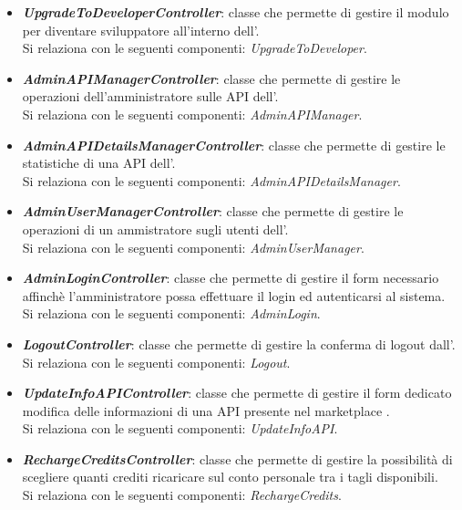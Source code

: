 \begin{itemize}
\begin{itemize}
		\item \textbf{\textit{UpgradeToDeveloperController}}: classe che permette di gestire il modulo per diventare sviluppatore all'interno dell'\progetto.\\
		Si relaziona con le seguenti componenti: \textit{UpgradeToDeveloper}.
		
		\item \textbf{\textit{AdminAPIManagerController}}: classe che permette di gestire le operazioni dell'amministratore sulle API dell'\progetto.\\
		Si relaziona con le seguenti componenti: \textit{AdminAPIManager}.
		
		\item \textbf{\textit{AdminAPIDetailsManagerController}}: classe che permette di gestire le statistiche di una API dell'\progetto.\\
		Si relaziona con le seguenti componenti: \textit{AdminAPIDetailsManager}.
		
		\item \textbf{\textit{AdminUserManagerController}}: classe che permette di gestire le operazioni di un ammistratore sugli utenti dell'\progetto.\\
		Si relaziona con le seguenti componenti: \textit{AdminUserManager}.
		
		\item \textbf{\textit{AdminLoginController}}: classe che permette di gestire il form necessario affinchè l'amministratore possa effettuare il login ed autenticarsi al sistema.\\
		Si relaziona con le seguenti componenti: \textit{AdminLogin}.
		
		\item \textbf{\textit{LogoutController}}: classe che permette di gestire la conferma di logout dall'\progetto.\\
		Si relaziona con le seguenti componenti: \textit{Logout}.
		
		\item \textbf{\textit{UpdateInfoAPIController}}: classe che permette di gestire il form dedicato modifica delle informazioni di una API presente nel marketplace \progetto.\\
		Si relaziona con le seguenti componenti: \textit{UpdateInfoAPI}.
		
		\item \textbf{\textit{RechargeCreditsController}}: classe che permette di gestire la possibilità di scegliere quanti crediti ricaricare sul conto personale tra i tagli disponibili.\\
		Si relaziona con le seguenti componenti: \textit{RechargeCredits}.
		

\end{itemize}
\end{itemize}
